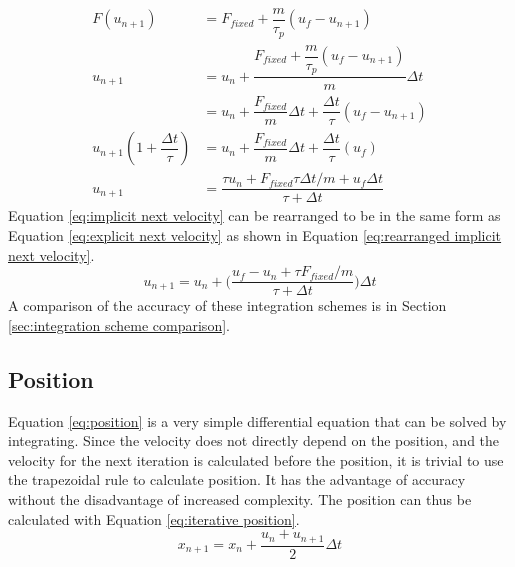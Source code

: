 \documentclass[a4paper,11pt,titlepage]{report}
\begin{document}
\begin{align}
F(u_{n+1}) &= F_{fixed} + \dfrac{m}{\tau_p}(u_f - u_{n+1}) \nonumber \\
u_{n+1} &= u_n + \dfrac{F_{fixed} + \dfrac{m}{\tau_p}(u_f - u_{n+1})}{m}\Delta t \nonumber \\
&= u_n + \dfrac{F_{fixed}}{m}\Delta t + \dfrac{\Delta t}{\tau}(u_f - u_{n+1}) \nonumber \\
u_{n+1} (1 + \dfrac{\Delta t}{\tau}) &= u_n + \dfrac{F_{fixed}}{m}\Delta t + \dfrac{\Delta t}{\tau}(u_f) \nonumber \\
u_{n+1} &= \dfrac{\tau u_n + F_{fixed} \tau \Delta t / m + u_f \Delta t}{\tau + \Delta t} \label{eq:implicit next velocity}
\end{align}
Equation \ref{eq:implicit next velocity} can be rearranged to be in the same form as Equation \ref{eq:explicit next velocity} as shown in Equation \ref{eq:rearranged implicit next velocity}.
\begin{equation}
u_{n+1} = u_n + \Big(\dfrac{u_f - u_n + \tau F_{fixed} / m}{\tau + \Delta t}\Big)\Delta t
\label{eq:rearranged implicit next velocity}
\end{equation}
A comparison of the accuracy of these integration schemes is in Section \ref{sec:integration scheme comparison}.
\subsection{Position}
Equation \ref{eq:position} is a very simple differential equation that can be solved by integrating. Since the velocity does not directly depend on the position, and the velocity for the next iteration is calculated before the position, it is trivial to use the trapezoidal rule to calculate position. It has the advantage of accuracy without the disadvantage of increased complexity. The position can thus be calculated with Equation \ref{eq:iterative position}.
\begin{equation}
x_{n+1} = x_n + \dfrac{u_n + u_{n+1}}{2}\Delta t
\label{eq:iterative position}
\end{equation}
\end{document}
